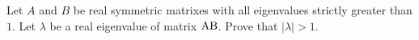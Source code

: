 Let  $\displaystyle{A}$ and $\displaystyle{B}$ be real symmetric matrixes with all eigenvalues strictly greater than $\displaystyle{1}$. Let $\displaystyle{\lambda }$ be a real eigenvalue of matrix $\displaystyle{{\rm A}{\rm B}}$. Prove that $\displaystyle{\left| \lambda  \right| > 1}$.

